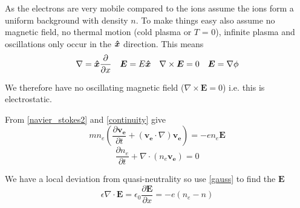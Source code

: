 As the electrons are very mobile compared to the ions assume the ions form a uniform background with density $n$. To make things easy also assume no magnetic field, no thermal motion (cold plasma or $T$ = 0), infinite plasma and oscillations only occur in the $\bm{\hat{x}}$ direction. This means
\begin{equation}
	\nabla = \bm{\hat{x}}\frac{\partial}{\partial x} \quad \bm{E} = E\bm{\hat{x}} \quad \nabla \times \bm{E} = 0 \quad \bm{E} = \nabla \phi
\end{equation}

We therefore have no oscillating magnetic field ($\nabla \times \bm{E} = 0$) i.e. this is electrostatic.

From \eqref{navier_stokes2} and \eqref{continuity} give
\begin{equation}
	mn_e\left(\frac{\partial \bm{v_e}}{\partial t} + \left(\bm{v_e} \cdot \nabla\right) \bm{v_e}\right) = -en_e\bm{E}
\end{equation} 
\begin{equation}
	\frac{\partial n_e}{\partial t} + \nabla \cdot \left(n_e\bm{v_e}\right) = 0
\end{equation}

We have a local deviation from quasi-neutrality so use \eqref{gauss} to find the $\bm{E}$
\begin{equation}
	\epsilon \nabla \cdot \bm{E} = \epsilon_0 \frac{\partial \bm{E}}{\partial x} = -e(n_e - n)
\end{equation}


